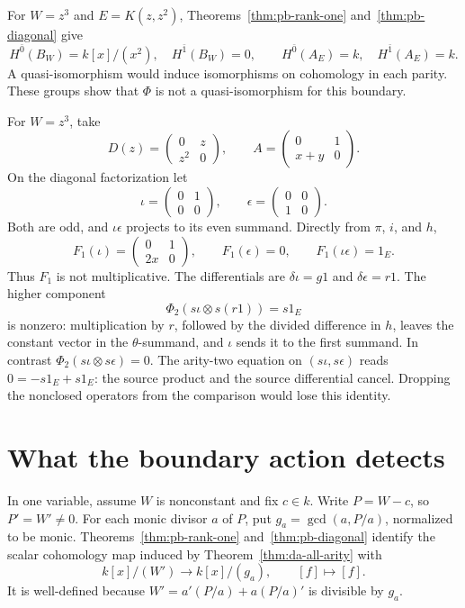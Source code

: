 For \(W=z^3\) and \(E=K(z,z^2)\),
Theorems~\ref{thm:pb-rank-one} and~\ref{thm:pb-diagonal} give
\[
 H^{\bar0}(B_W)=k[x]/(x^2),\quad H^{\bar1}(B_W)=0,
 \qquad
 H^{\bar0}(A_E)=k,\quad H^{\bar1}(A_E)=k.
\]
A quasi-isomorphism would induce isomorphisms on cohomology in
each parity. These groups show that \(\Phi\) is not a
quasi-isomorphism for this boundary.

\begin{example}
\label{ex:da-product}
For \(W=z^3\), take
\[
 D(z)=\begin{pmatrix}0&z\\z^2&0\end{pmatrix},\qquad
 A=\begin{pmatrix}0&1\\x+y&0\end{pmatrix}.
\]
On the diagonal factorization let
\[
 \iota=\begin{pmatrix}0&1\\0&0\end{pmatrix},\qquad
 \epsilon=\begin{pmatrix}0&0\\1&0\end{pmatrix}.
\]
Both are odd, and \(\iota\epsilon\) projects to its even summand.
Directly from \(\pi\), \(i\), and \(h\),
\[
 F_1(\iota)=\begin{pmatrix}0&1\\2x&0\end{pmatrix},
 \qquad F_1(\epsilon)=0,\qquad
 F_1(\iota\epsilon)=1_E.
\]
Thus \(F_1\) is not multiplicative.
The differentials are \(\delta\iota=g1\) and
\(\delta\epsilon=r1\).
The higher component
\[
 \Phi_2(s\iota\otimes s(r1))=s1_E
\]
is nonzero: multiplication by \(r\), followed by the divided
difference in \(h\), leaves the constant vector in the
\(\theta\)-summand, and \(\iota\) sends it to the first summand.
In contrast \(\Phi_2(s\iota\otimes s\epsilon)=0\).
The arity-two equation on \((s\iota,s\epsilon)\) reads
\(0=-s1_E+s1_E\): the source product and the source differential
cancel. Dropping the nonclosed operators from the comparison
would lose this identity.
\end{example}

\section{What the boundary action detects}
\label{sec:da-detection}

In one variable, assume \(W\) is nonconstant and fix \(c\in k\).
Write \(P=W-c\), so \(P'=W'\ne0\).
For each monic divisor \(a\) of \(P\), put
\(g_a=\gcd(a,P/a)\), normalized to be monic.
Theorems~\ref{thm:pb-rank-one} and~\ref{thm:pb-diagonal}
identify the scalar cohomology map induced by
Theorem~\ref{thm:da-all-arity} with
\[
 k[x]/(W')\longrightarrow k[x]/(g_a),\qquad [f]\longmapsto[f].
\]
It is well-defined because
\(W'=a'(P/a)+a(P/a)'\) is divisible by \(g_a\).

